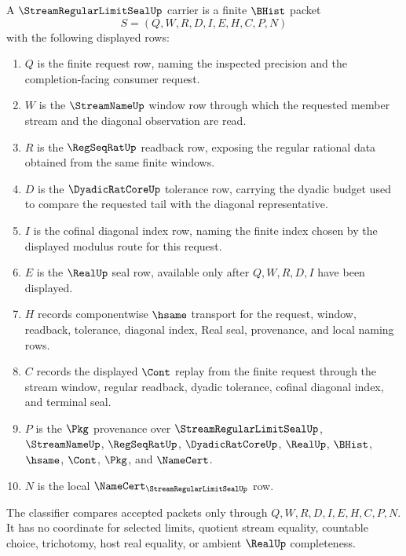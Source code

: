 \begin{definition}
\label{def:stream-regular-limit-seal-carrier}
A $\StreamRegularLimitSealUp$ carrier is a finite $\BHist$ packet
$$
S=(Q,W,R,D,I,E,H,C,P,N)
$$
with the following displayed rows:
\begin{enumerate}
\item $Q$ is the finite request row, naming the inspected precision and the completion-facing consumer request.
\item $W$ is the $\StreamNameUp$ window row through which the requested member stream and the diagonal observation are read.
\item $R$ is the $\RegSeqRatUp$ readback row, exposing the regular rational data obtained from the same finite windows.
\item $D$ is the $\DyadicRatCoreUp$ tolerance row, carrying the dyadic budget used to compare the requested tail with the diagonal representative.
\item $I$ is the cofinal diagonal index row, naming the finite index chosen by the displayed modulus route for this request.
\item $E$ is the $\RealUp$ seal row, available only after $Q,W,R,D,I$ have been displayed.
\item $H$ records componentwise $\hsame$ transport for the request, window, readback, tolerance, diagonal index, Real seal, provenance, and local naming rows.
\item $C$ records the displayed $\Cont$ replay from the finite request through the stream window, regular readback, dyadic tolerance, cofinal diagonal index, and terminal seal.
\item $P$ is the $\Pkg$ provenance over $\StreamRegularLimitSealUp$, $\StreamNameUp$, $\RegSeqRatUp$, $\DyadicRatCoreUp$, $\RealUp$, $\BHist$, $\hsame$, $\Cont$, $\Pkg$, and $\NameCert$.
\item $N$ is the local $\NameCert_{\StreamRegularLimitSealUp}$ row.
\end{enumerate}
The classifier compares accepted packets only through $Q,W,R,D,I,E,H,C,P,N$. It has no coordinate for selected limits, quotient stream equality, countable choice, trichotomy, host real equality, or ambient $\RealUp$ completeness.
\end{definition}

